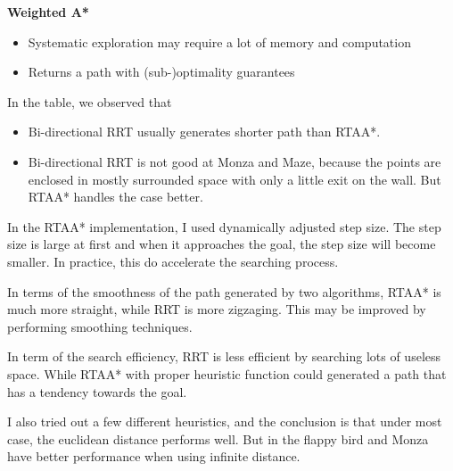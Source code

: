 \documentclass{article} %
\begin{document}
\textbf{Weighted A*}
\begin{itemize}
    \item Systematic exploration may require a lot of memory and computation
    \item Returns a path with (sub-)optimality guarantees
\end{itemize}

In the table, we observed that 
\begin{itemize}
    \item Bi-directional RRT usually generates shorter path than RTAA*.
    \item Bi-directional RRT is not good at Monza and Maze, because the points are enclosed in mostly surrounded space with only a little exit on the wall. But RTAA* handles the case better.
\end{itemize}

In the RTAA* implementation, I used dynamically adjusted step size. The step size is large at first and when it approaches the goal, the step size will become smaller. In practice, this do accelerate the searching process.

In terms of the smoothness of the path generated by two algorithms, RTAA* is much more straight, while RRT is more zigzaging. This may be improved by performing smoothing techniques.

In term of the search efficiency, RRT is less efficient by searching lots of useless space. While RTAA* with proper heuristic function could generated a path that has a tendency towards the goal. 

I also tried out a few different heuristics, and the conclusion is that under most case, the euclidean distance performs well. But in the flappy bird and Monza have better performance when using infinite distance.
\end{document}
